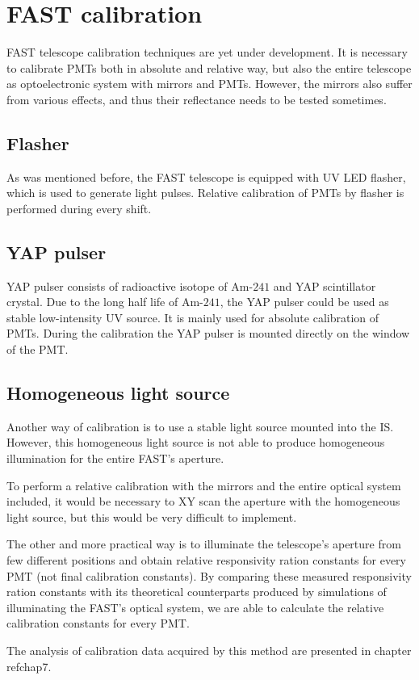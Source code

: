 \section{FAST calibration}
FAST telescope calibration techniques are yet under development. It is necessary to calibrate PMTs both in absolute and relative way, but also the entire telescope as optoelectronic system with mirrors and PMTs. However, the mirrors also suffer from various effects, and thus their reflectance needs to be tested sometimes.
\subsection{Flasher}
As was mentioned before, the FAST telescope is equipped with UV LED flasher, which is used to generate light pulses. Relative calibration of PMTs by flasher is performed during every shift.
\subsection{YAP pulser}
YAP pulser consists of radioactive isotope of $\textrm{Am-241}$ and YAP scintillator crystal. Due to the long half life of $\textrm{Am-241}$, the YAP pulser could be used as stable low-intensity UV source. 
It is mainly used for absolute calibration of PMTs. During the calibration the YAP pulser is mounted directly on the window of the PMT.

\subsection{Homogeneous light source}
Another way of calibration is to use a stable light source mounted into the IS. However, this homogeneous light source is not able to produce homogeneous illumination for the entire FAST's aperture.  
\par
To perform a relative calibration with the mirrors and the entire optical system included, it would be necessary to XY scan the aperture with the homogeneous light source, but this would be very difficult to implement.   

\par
The other and more practical way is to illuminate the telescope's aperture from few different positions and obtain relative responsivity ration constants for every PMT (not final calibration constants). By comparing these measured responsivity ration constants with its theoretical counterparts produced by simulations of illuminating the FAST's optical system, we are able to calculate the relative calibration constants for every PMT.       
\par
The analysis of calibration data acquired by this method are presented in chapter ref{chap7}.

